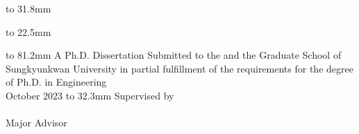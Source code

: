 \setlength{\parskip}{0pt}
\vspace{13.7mm}
\vspace{8.4mm}

\begin{center}
\vbox to 31.8mm {
    \vspace{0.5mm}
    \setlength{\parskip}{7.2pt}
    \fontsize{22pt}{22pt}\selectfont
    \thesistitle
    \vfill
}
\nointerlineskip

\vbox to 22.5mm {
    \fontsize{16pt}{16pt}\selectfont
    \vfill
    \studentname
    \vfill
}
\nointerlineskip

\vbox to 81.2mm {
    \fontsize{14pt}{14pt}\selectfont
    \setlength{\parskip}{8.4pt}
    \vfill
    A Ph.D. Dissertation Submitted to the \departmentname
    and the Graduate School of Sungkyunkwan University in
    partial fulfillment of the requirements for the degree
    of Ph.D. in Engineering\\ 
    \hfill\break
    October 2023
    \vfill
}
\nointerlineskip
\vbox to 32.3mm {
    \fontsize{16pt}{16pt}\selectfont
    \setlength{\parskip}{7.2pt}
    \vfill
    Supervised by\\
    \advisorname\\
    Major Advisor
    \vfill
}
\nointerlineskip


\end{center}
